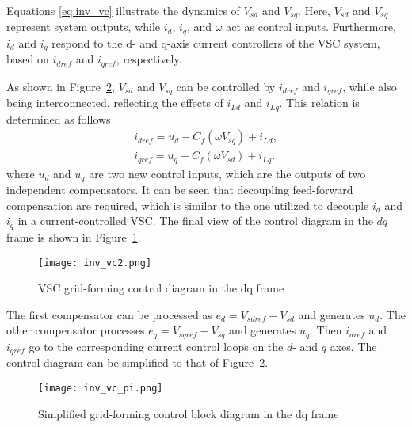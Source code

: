 Equations \ref{eq:inv_vc} illustrate the dynamics of $V_{sd}$ and $V_{sq}$. Here, $V_{sd}$ and $V_{sq}$ represent system outputs, while $i_d$, $i_q$, and $\omega$ act as control inputs. Furthermore, $i_d$ and $i_q$ respond to the d- and q-axis current controllers of the VSC system, based on $i_{dref}$ and $i_{qref}$, respectively.

As shown in Figure~\cref{fig:inv_vc}, $V_{sd}$ and $V_{sq}$ can be controlled by $i_{dref}$ and $i_{qref}$, while also being interconnected, reflecting the effects of $i_{Ld}$ and $i_{Lq}$. This relation is determined as follows
\begin{equation}
    \begin{array}{l}
        i_{d r e f}=u_{d}-C_{f}\left(\omega V_{s q}\right)+i_{L d}, \\
        i_{q r e f}=u_{q}+C_{f}\left(\omega V_{s d}\right)+i_{L q} .
    \end{array}
\end{equation}
where $u_d$ and $u_q$ are two new control inputs, which are the outputs of two independent compensators. It can be seen that decoupling feed-forward compensation are required, which is similar to the one utilized to decouple $i_d$ and $i_q$ in a current-controlled VSC. The final view of the control diagram in the $dq$ frame is shown in Figure~\cref{fig:inv_diagram_gfm}.

\begin{figure}[htbp]
    \centering
    \texttt{[image: inv\_vc2.png]}
    \caption{VSC grid-forming control diagram in the dq frame}
    \label{fig:inv_diagram_gfm}
\end{figure}

The first compensator can be processed as $e_d = V_{sdref}-V_{sd}$ and generates $u_d$. The other compensator processes $e_q = V_{sqref}-V_{sq}$ and generates $u_q$. Then $i_{dref}$ and $i_{qref}$ go to the corresponding current control loops on the $d$- and $q$ axes. The control diagram can be simplified to that of Figure~\cref{fig:inv_vc}.

\begin{figure}[htbp]
    \centering
    \texttt{[image: inv\_vc\_pi.png]}
    \caption{Simplified grid-forming control block diagram in the dq frame \autocite{book_yazdani_2010}}
    \label{fig:inv_vc}
\end{figure}


